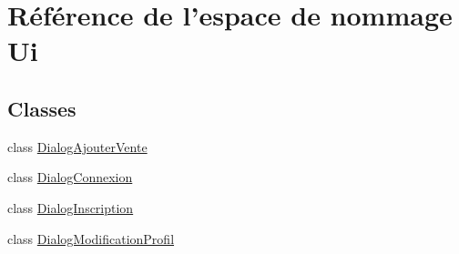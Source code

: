 \hypertarget{namespace_ui}{\section{Référence de l'espace de nommage Ui}
\label{namespace_ui}
}
\subsection*{Classes}
\begin{DoxyCompactItemize}
\item 
class \hyperlink{class_ui_1_1_dialog_ajouter_vente}{Dialog\-Ajouter\-Vente}
\item 
class \hyperlink{class_ui_1_1_dialog_connexion}{Dialog\-Connexion}
\item 
class \hyperlink{class_ui_1_1_dialog_inscription}{Dialog\-Inscription}
\item 
class \hyperlink{class_ui_1_1_dialog_modification_profil}{Dialog\-Modification\-Profil}
\end{DoxyCompactItemize}
